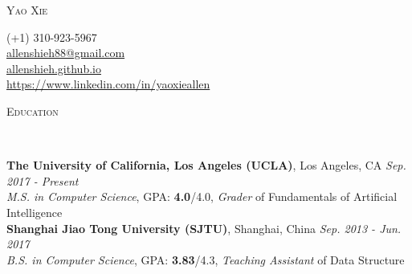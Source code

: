 \documentclass[10pt]{article}
\newenvironment{changemargin}[2]{%
  \begin{list}{}{%
    \setlength{\topsep}{0pt}%
    \setlength{\leftmargin}{#1}%
    \setlength{\rightmargin}{#2}%
    \setlength{\listparindent}{\parindent}%
    \setlength{\itemindent}{\parindent}%
    \setlength{\parsep}{\parskip}%
  }%
  \item[]}{\end{list}
}
\newcommand{\lineover}{
	\begin{changemargin}{-0.05in}{-0.05in}
		\vspace*{-8pt}
		\hrulefill \\
		\vspace*{-2pt}
	\end{changemargin}
}
\newcommand{\header}[1]{
	\begin{changemargin}{-0.7in}{-0.65in}
		\scshape{\large{#1}}\\
  	\lineover
	\end{changemargin}
}
\newenvironment{body} {
	\vspace*{-16pt}
	\begin{changemargin}{-0.65in}{-0.62in}
  }	
	{\end{changemargin}
}
\newcommand{\contactx}[5]{
		\begin{changemargin}{-0.8in}{-0.94in}
		\noindent \lettrine[lines=4]{
			\smallskip \fontsize{32}{32}\selectfont \scshape{#1}}{}
	\end{changemargin}
	\begin{changemargin}{-0.5in}{-0.6in}
			\begin{flushright} 
				{#2}\\ \smallskip
				\href{mailto:#3}{#3}\\ \smallskip
				\url{#4}\\ \smallskip
				\url{#5}\\ \smallskip
			\end{flushright}
	\end{changemargin}
}
\begin{document}
\contactx{Yao Xie}{(+1) 310-923-5967}{allenshieh88@gmail.com}{allenshieh.github.io}{https://www.linkedin.com/in/yaoxieallen}


\smallskip
\vspace{-4pt}

\header{Education}

\begin{body}
	\vspace{14pt}

	\textbf{The University of California, Los Angeles (UCLA)}, Los Angeles, CA \hfill \emph{Sep. 2017 - Present}{} \\
	\emph{M.S. in Computer Science}, GPA: \textbf{4.0}/4.0, \textit{Grader} of Fundamentals of Artificial Intelligence \\
	
	
	\vspace{2pt}
	\textbf{Shanghai Jiao Tong University (SJTU)}, Shanghai, China \hfill \emph{Sep. 2013 - Jun. 2017}{} \\
	\emph{B.S. in Computer Science}, GPA: \textbf{3.83}/4.3, \textit{Teaching Assistant} of Data Structure \\
	
	
	
\end{body}

\smallskip
\vspace{-4pt}
\end{document}
